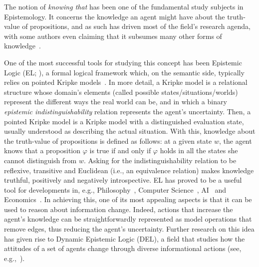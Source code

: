 The notion of \emph{knowing that} has been one of the fundamental study subjects in Epistemology. It concerns the knowledge an agent might have about the truth-value of propositions, and as such has driven most of the field's research agenda, with some authors even claiming that it subsumes many other forms of knowledge~\cite{BoenLycan75}. 
 
One of the most successful tools for studying this concept has been Epistemic Logic (EL; \cite{Hintikka:kab}), a formal logical framework which, on the semantic side, typically relies on pointed Kripke models~\cite{mlbook,HML}. In more detail, a Kripke model is a relational structure whose domain's elements (called possible states/situations/worlds) represent the different ways the real world can be, and in which a binary \emph{epistemic indistinguishability} relation represents the agent's uncertainty. Then, a pointed Kripke model is a Kripke model with a distinguished evaluation state, usually understood as describing the actual situation. With this, knowledge about the truth-value of propositions is defined as follows: at a given state $w$, the agent knows that a proposition $\varphi$ is true if and only if $\varphi$ holds in all the states she cannot distinguish from $w$. Asking for the indistinguishability relation to be reflexive, transitive and Euclidean (i.e., an equivalence relation) makes knowledge truthful, positively and negatively introspective. EL has proved to be a useful tool for developments in, e.g., Philosophy~\cite{rfe,Holliday2018}, Computer Science~\cite{RAK}, AI~\cite{elfaics} and Economics~\cite{egepgt}. In achieving this, one of its most appealing aspects is that it can be used to reason about information change. Indeed, actions that increase the agent's knowledge can be straightforwardly represented as model operations that remove edges, thus reducing the agent's uncertainty. Further research on this idea has given rise to Dynamic Epistemic Logic (DEL), a field that studies how the attitudes of a set of agents change through diverse informational actions (see, e.g.,~\cite{DELbook,vanBenthem2011ldii}). 


